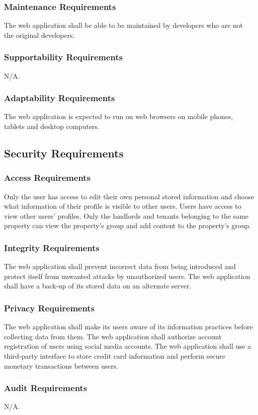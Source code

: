 \documentclass[12pt, titlepage]{article}
\begin{document}
{\subsubsection{Maintenance Requirements}
The web application shall be able to be maintained by developers who are not the 
original developers.
\subsubsection{Supportability Requirements}
N/A.
\subsubsection{Adaptability Requirements}
The web application is expected to run on web browsers on mobile phones, tablets 
and desktop computers.
\subsection{Security Requirements}
\subsubsection{Access Requirements}
Only the user has access to edit their own personal stored information and 
choose what information of their profile is visible to other users. Users have 
access to view other users' profiles. Only the landlords and tenants belonging 
to the same property can view the property's group and add content to the 
property's group.
\subsubsection{Integrity Requirements}
The web application shall prevent incorrect data from being introduced and 
protect itself from unwanted attacks by unauthorized users. The web application 
shall have a back-up of its stored data on an alternate server.
\subsubsection{Privacy Requirements}
The web application shall make its users aware of its information practices 
before collecting data from them. The web application shall authorize account 
registration of users using social media accounts. The web application shall use 
a third-party interface to store credit card information and perform secure 
monetary transactions between users.
\subsubsection{Audit Requirements}
N/A.
}
\end{document}
